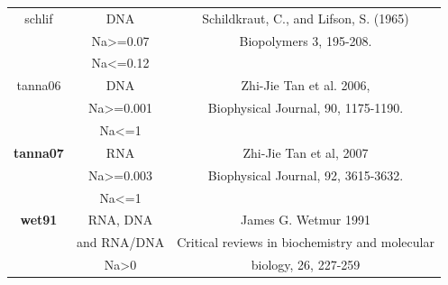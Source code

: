 \documentclass{article}
\begin{document}
\begin{table}[hc]
\begin{tabular}[h]{| c | c | c |}
 \hline 
schlif & DNA & Schildkraut, C., and Lifson, S. (1965) \\
 & Na>=0.07 & Biopolymers 3, 195-208. \\
 & Na<=0.12 & \\
 \hline
tanna06 & DNA & Zhi-Jie Tan et al. 2006,  \\
 & Na>=0.001 & Biophysical Journal, 90, 1175-1190. \\
 & Na<=1 & \\
 \hline
\textbf{tanna07} & RNA & Zhi-Jie Tan et al, 2007 \\
 & Na>=0.003 & Biophysical Journal, 92, 3615-3632. \\
 & Na<=1 & \\
 \hline
\textbf{wet91} & RNA, DNA & James G. Wetmur 1991 \\
 & and RNA/DNA & Critical reviews in biochemistry and molecular \\
 & Na>0 & biology, 26, 227-259 \\
  \hline
\end{tabular}
\end{table}

\clearpage
\end{document}
